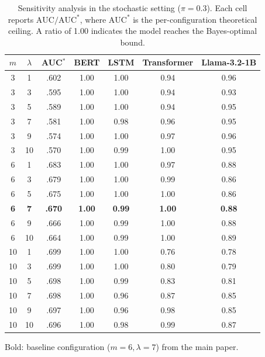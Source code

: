 \documentclass{article}
\theoremstyle{plain}
\theoremstyle{definition}
\theoremstyle{remark}
\begin{document}
\begin{table}[t]
  \centering
  \caption{Sensitivity analysis in the stochastic setting ($\pi=0.3$). Each cell reports $\text{AUC}/\text{AUC}^*$, where $\text{AUC}^*$ is the            
  per-configuration theoretical ceiling. A ratio of 1.00 indicates the model reaches the Bayes-optimal bound.}
  \label{tab:sensitivity}
  \small
  \begin{tabular}{cc c cccc}
  \toprule                                                                    
  $m$ & $\lambda$ & AUC$^*$ & BERT & LSTM & Transformer & Llama-3.2-1B \\
  \midrule                             
  3  & 1  & .602 & 1.00 & 1.00 & 0.94 & 0.96 \\
  3  & 3  & .595 & 1.00 & 1.00 & 0.94 & 0.93 \\                              
  3  & 5  & .589 & 1.00 & 1.00 & 0.94 & 0.95 \\                             
  3  & 7  & .581 & 1.00 & 0.98 & 0.96 & 0.95 \\
  3  & 9  & .574 & 1.00 & 1.00 & 0.97 & 0.96 \\
  3  & 10 & .570 & 1.00 & 0.99 & 1.00 & 0.95 \\
  \midrule
  6  & 1  & .683 & 1.00 & 1.00 & 0.97 & 0.88 \\
  6  & 3  & .679 & 1.00 & 1.00 & 0.99 & 0.86 \\                    
  6  & 5  & .675 & 1.00 & 1.00 & 1.00 & 0.86 \\
  \textbf{6}  & \textbf{7}  & \textbf{.670} & \textbf{1.00} & \textbf{0.99} & \textbf{1.00} & \textbf{0.88} \\
  6  & 9  & .666 & 1.00 & 0.99 & 1.00 & 0.88 \\
  6  & 10 & .664 & 1.00 & 0.99 & 1.00 & 0.89 \\                           
  \midrule        
  10 & 1  & .699 & 1.00 & 1.00 & 0.76 & 0.78 \\
  10 & 3  & .699 & 1.00 & 1.00 & 0.80 & 0.79 \\
  10 & 5  & .698 & 1.00 & 0.99 & 0.83 & 0.81 \\
  10 & 7  & .698 & 1.00 & 0.96 & 0.87 & 0.85 \\
  10 & 9  & .697 & 1.00 & 0.96 & 0.98 & 0.85 \\                             
  10 & 10 & .696 & 1.00 & 0.98 & 0.99 & 0.87 \\
  \bottomrule
  \end{tabular}

  \parbox{\textwidth}{\raggedright\footnotesize
    \vspace{3pt} %
    Bold: baseline configuration ($m{=}6, \lambda{=}7$) from the main paper.
  }
\end{table}
\end{document}
